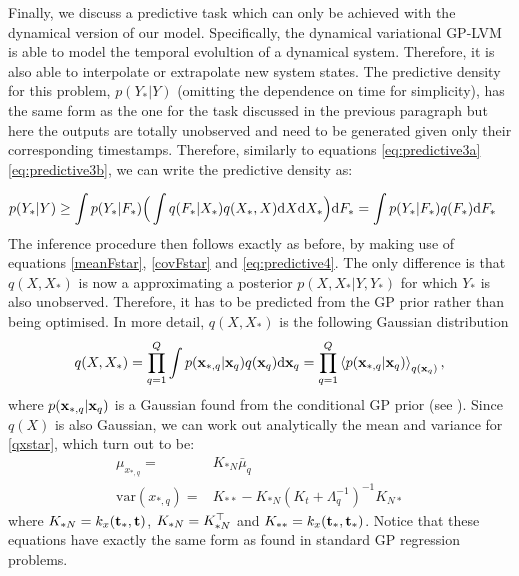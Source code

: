 Finally, we discuss a predictive task which can only be achieved with the dynamical version of our model.
Specifically, the dynamical variational GP-LVM is able to model the temporal evolultion of a dynamical system.
Therefore, it is also able to interpolate or extrapolate new system states.
The predictive density for this problem, $p(Y_* | Y)$ (omitting the dependence on time for simplicity), has the
same form as the one for the task discussed in the previous paragraph but here the outputs are totally
unobserved and need to be generated given only their corresponding timestamps.  
Therefore, similarly to equations \eqref{eq:predictive3a} \eqref{eq:predictive3b}, we can write the predictive density as:

\begin{align}
p(Y_* | Y) & \geq \int p(Y_* | F_*)  \Big( \int q(F_* |X_*) q(X_*,X) \text{d} X \text{d} X_* \Big) \text{d} F_*
		     = \int p(Y_* | F_*)  q(F_*) \text{d} F_*  \label{eq:predictiveDyn3}
\end{align}
The inference procedure then follows exactly as before, by making
use of equations \eqref{meanFstar}, \eqref{covFstar} and \eqref{eq:predictive4}.
The only difference is that $q(X,X_*)$ is now a approximating a posterior $p(X, X_*| Y, Y_*)$ for which $Y_*$
is also unobserved. Therefore, it has to be predicted from the GP prior rather than being optimised.
In more detail, $q(X,X_*)$ is the following Gaussian distribution
 \begin{align}
  q(X,X_*) = %
 \prod_{q=1}^Q   \int  p(\bfx_{*,q} | \bfx_q) q(\bfx_q) \intd \bfx_q = \prod_{q=1}^Q \la  p(\bfx_{*,q} | \bfx_q) \ra_{q(\bfx_q)} ,\label{qxstar}
 \end{align}
 where $p(\mathbf{x}_{*,q} | \mathbf{x}_q)$ is a Gaussian found from the conditional GP prior
 (see \cite{rasmussen-williams}). Since $q(X)$ is also Gaussian, we can work out analytically the mean and variance 
 for \eqref{qxstar}, which turn out to be:
 \begin{align}
  \mu_{x_{*,q}} = {}& K_{*N} \bar{\mu}_q \\
   \text{var}(x_{*,q}) = {}& K_{**} - K_{*N} (K_t + \Lambda_q^{-1})^{-1} K_{N*}
 \end{align}
 where $K_{*N} = k_x(\mathbf{t}_*, \mathbf{t})$, $K_{*N} = K_{*N}^{\top}$ and $K_{**} = k_x(\mathbf{t}_*, \mathbf{t}_*)$. Notice that these equations have
 exactly the same form as found in standard GP regression problems.



